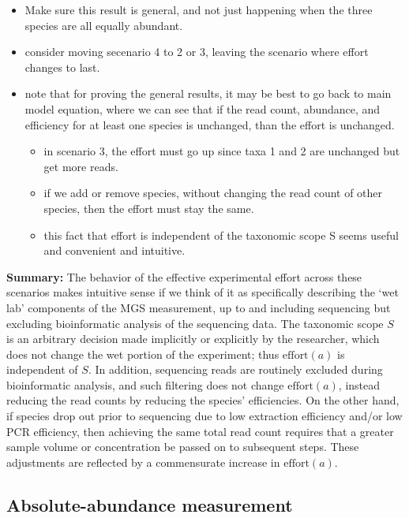 \documentclass[
]{article}
\providecommand{\tightlist}{%
  \setlength{\itemsep}{0pt}\setlength{\parskip}{0pt}}
\begin{document}
\begin{itemize}
\tightlist
\item
  Make sure this result is general, and not just happening when the three species are all equally abundant.
\item
  consider moving secenario 4 to 2 or 3, leaving the scenario where effort changes to last.
\item
  note that for proving the general results, it may be best to go back to main model equation, where we can see that if the read count, abundance, and efficiency for at least one species is unchanged, than the effort is unchanged.

  \begin{itemize}
  \tightlist
  \item
    in scenario 3, the effort must go up since taxa 1 and 2 are unchanged but get more reads.
  \item
    if we add or remove species, without changing the read count of other species, then the effort must stay the same.
  \item
    this fact that effort is independent of the taxonomic scope S seems useful and convenient and intuitive.
  \end{itemize}
\end{itemize}

\textbf{Summary:}
The behavior of the effective experimental effort across these scenarios makes intuitive sense if we think of it as specifically describing the `wet lab' components of the MGS measurement, up to and including sequencing but excluding bioinformatic analysis of the sequencing data.
The taxonomic scope \(S\) is an arbitrary decision made implicitly or explicitly by the researcher, which does not change the wet portion of the experiment; thus \(\text{effort}(a)\) is independent of \(S\).
In addition, sequencing reads are routinely excluded during bioinformatic analysis, and such filtering does not change \(\text{effort}(a)\), instead reducing the read counts by reducing the species' efficiencies.
On the other hand, if species drop out prior to sequencing due to low extraction efficiency and/or low PCR efficiency, then achieving the same total read count requires that a greater sample volume or concentration be passed on to subsequent steps.
These adjustments are reflected by a commensurate increase in \(\text{effort}(a)\).

\hypertarget{absolute-abundance-measurement}{%
\subsection{Absolute-abundance measurement}\label{absolute-abundance-measurement}}
\end{document}
